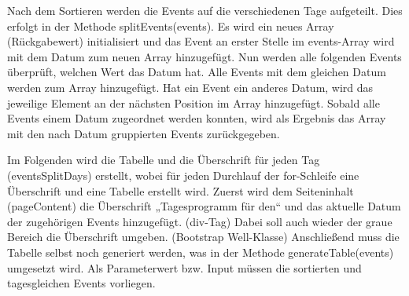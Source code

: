{Nach dem Sortieren werden die Events auf die verschiedenen Tage aufgeteilt. Dies erfolgt in der Methode splitEvents(events). Es wird ein neues Array (Rückgabewert) initialisiert und das Event an erster Stelle im events-Array wird mit dem Datum zum neuen Array hinzugefügt. Nun werden alle folgenden Events überprüft, welchen Wert das Datum hat. Alle Events mit dem gleichen Datum werden zum Array hinzugefügt. Hat ein Event ein anderes Datum, wird das jeweilige Element an der nächsten Position im Array hinzugefügt. Sobald alle Events einem Datum zugeordnet werden konnten, wird als Ergebnis das Array mit den nach Datum gruppierten Events zurückgegeben.

Im Folgenden wird die Tabelle und die Überschrift für jeden Tag (eventsSplitDays) erstellt, wobei für jeden Durchlauf der for-Schleife eine Überschrift und eine Tabelle erstellt wird. Zuerst wird dem Seiteninhalt (pageContent) die Überschrift „Tagesprogramm für den“ und das aktuelle Datum der zugehörigen Events hinzugefügt. (div-Tag) Dabei soll auch wieder der graue Bereich die Überschrift umgeben. (Bootstrap Well-Klasse) 
Anschließend muss die Tabelle selbst noch generiert werden, was in der Methode generateTable(events) umgesetzt wird. Als Parameterwert bzw. Input müssen die sortierten und tagesgleichen Events vorliegen. 

}
